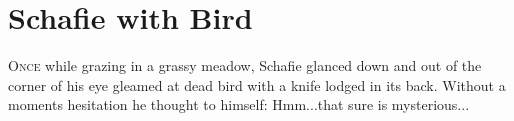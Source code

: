 \chapter{Schafie with Bird}
\lettrine[lines=3,loversize=-0.2,lraise=0.2]{O}{nce} while grazing in a grassy meadow, Schafie glanced down and out of the corner of his eye gleamed at dead bird with a knife lodged in its back. Without a moments hesitation he thought to himself:
Hmm...that sure is mysterious...
